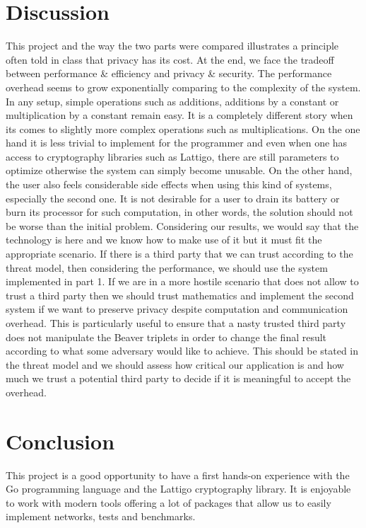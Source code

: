 \documentclass[10pt,conference]{IEEEtran}
\begin{document}
\section{Discussion}
This project and the way the two parts were compared illustrates a principle often told in class that privacy has its cost. At the end, we face the tradeoff between performance \& efficiency and privacy \& security. The performance overhead seems to grow exponentially comparing to the complexity of the system. In any setup, simple operations such as additions, additions by a constant or multiplication by a constant remain easy. It is a completely different story when its comes to slightly more complex operations such as multiplications. On the one hand it is less trivial to implement for the programmer and even when one has access to cryptography libraries such as Lattigo, there are still parameters to optimize otherwise the system can simply become unusable. On the other hand, the user also feels considerable side effects when using this kind of systems, especially the second one. It is not desirable for a user to drain its battery or burn its processor for such computation, in other words, the solution should not be worse than the initial problem. Considering our results, we would say that the technology is here and we know how to make use of it but it must fit the appropriate scenario. If there is a third party that we can trust according to the threat model, then considering the performance, we should use the system implemented in part 1. If we are in a more hostile scenario that does not allow to trust a third party then we should trust mathematics and implement the second system if we want to preserve privacy despite computation and communication overhead. This is particularly useful to ensure that a nasty trusted third party does not manipulate the Beaver triplets in order to change the final result according to what some adversary would like to achieve. This should be stated in the threat model and we should assess how critical our application is and how much we trust a potential third party to decide if it is meaningful to accept the overhead.

\section{Conclusion}
This project is a good opportunity to have a first hands-on experience with the Go programming language and the Lattigo cryptography library. It is enjoyable to work with modern tools offering a lot of packages that allow us to easily implement networks, tests and benchmarks.
\end{document}
